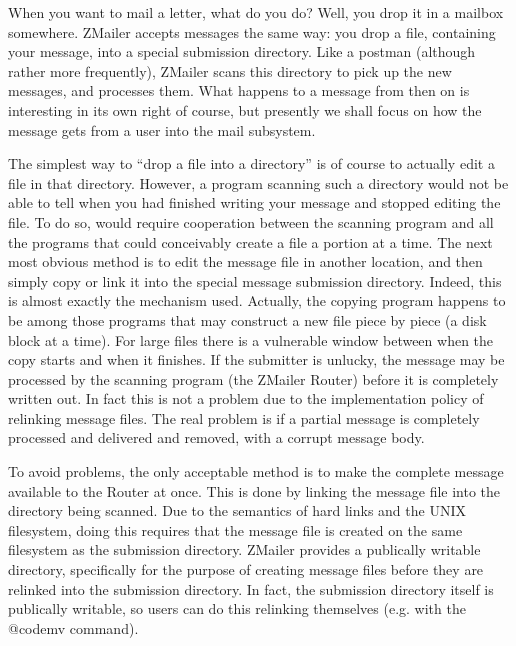 When you want to mail a letter, what do you do?
Well, you drop it in a mailbox somewhere.
ZMailer accepts messages the same way: you drop a file,
containing your message, into a special submission directory.
Like a postman (although rather more frequently), ZMailer scans
this directory to pick up the new messages, and processes them.
What happens to a message from then on is interesting in its
own right of course, but presently we shall focus on how the
message gets from a user into the mail subsystem.

The simplest way to ``drop a file into a directory'' is
of course to actually edit a file in that directory.
However, a program scanning such a directory would not be
able to tell when you had finished writing your message
and stopped editing the file.
To do so, would require cooperation between the scanning
program and all the programs that could conceivably create
a file a portion at a time.
The next most obvious method is to edit the message file
in another location, and then simply copy or link it into
the special message submission directory.
Indeed, this is almost exactly the mechanism used.
Actually, the copying program happens to be among those
programs that may construct a new file piece by piece
(a disk block at a time).
For large files there is a vulnerable window between when
the copy starts and when it finishes.
If the submitter is unlucky, the message may be processed
by the scanning program (the ZMailer Router) before it is
completely written out.
In fact this is not a problem due to the implementation
policy of relinking message files.
The real problem is if a partial message is completely processed
and delivered and removed, with a corrupt message body.

To avoid problems, the only acceptable method is to make
the complete message available to the Router at once.
This is done by linking the message file into the directory
being scanned.
Due to the semantics of hard links and the UNIX filesystem,
doing this requires that the message file is created on the
same filesystem as the submission directory.
ZMailer provides a publically writable directory, specifically
for the purpose of creating message files before they are
relinked into the submission directory.
In fact, the submission directory itself is publically writable, so
users can do this relinking themselves (e.g. with the @code{mv} command).

